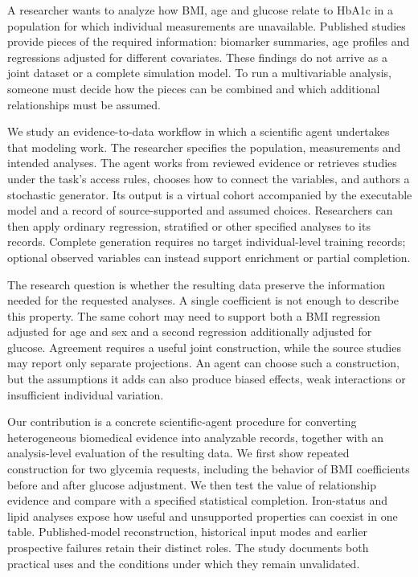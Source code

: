 \documentclass[11pt,letterpaper]{article}
\begin{document}
A researcher wants to analyze how BMI, age and glucose relate to HbA1c in a population for which individual measurements are unavailable. Published studies provide pieces of the required information: biomarker summaries, age profiles and regressions adjusted for different covariates. These findings do not arrive as a joint dataset or a complete simulation model. To run a multivariable analysis, someone must decide how the pieces can be combined and which additional relationships must be assumed.


We study an evidence-to-data workflow in which a scientific agent undertakes that modeling work. The researcher specifies the population, measurements and intended analyses. The agent works from reviewed evidence or retrieves studies under the task's access rules, chooses how to connect the variables, and authors a stochastic generator. Its output is a virtual cohort accompanied by the executable model and a record of source-supported and assumed choices. Researchers can then apply ordinary regression, stratified or other specified analyses to its records. Complete generation requires no target individual-level training records; optional observed variables can instead support enrichment or partial completion.


The research question is whether the resulting data preserve the information needed for the requested analyses. A single coefficient is not enough to describe this property. The same cohort may need to support both a BMI regression adjusted for age and sex and a second regression additionally adjusted for glucose. Agreement requires a useful joint construction, while the source studies may report only separate projections. An agent can choose such a construction, but the assumptions it adds can also produce biased effects, weak interactions or insufficient individual variation.


Our contribution is a concrete scientific-agent procedure for converting heterogeneous biomedical evidence into analyzable records, together with an analysis-level evaluation of the resulting data. We first show repeated construction for two glycemia requests, including the behavior of BMI coefficients before and after glucose adjustment. We then test the value of relationship evidence and compare with a specified statistical completion. Iron-status and lipid analyses expose how useful and unsupported properties can coexist in one table. Published-model reconstruction, historical input modes and earlier prospective failures retain their distinct roles. The study documents both practical uses and the conditions under which they remain unvalidated.
\end{document}
